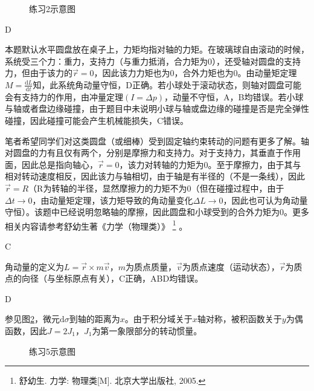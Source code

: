 \documentclass[b5paper,opensource,sourcefont,parskip]{qyxf-book}
\newcommand{\di}[1]{\mathrm{d}#1}
\newcommand{\dy}[2]{\frac{\di{#1}}{\di{#2}}}
\newcommand{\zbj}[4]
{
	\draw (0,0) node[below left] {$ O $};
	\draw [->] (#1,0) -- (#2,0) node[right] {$ x $};
	\draw [->] (0,#3) -- (0,#4) node[right] {$ y $};
}
\begin{document}
\begin{figure}[htbp]
\centering
{}
\caption{练习2示意图}\label{fig:c4-t2}
\end{figure}
			
D

\solve 本题默认水平圆盘放在桌子上，力矩均指对轴的力矩。在玻璃球自由滚动的时候，系统受三个力：重力，支持力（与重力抵消，合力矩为0），还受轴对圆盘的支持力，但由于该力的$ \vec{r}=0 $，因此该力力矩也为0，合外力矩也为0。由动量矩定理$ M=\dy{L}{t} $知，此系统角动量守恒，D正确。若小球处于滚动状态，则轴对圆盘可能会有支持力的作用，由冲量定理$ (I=\Delta p) $，动量不守恒，A，B均错误。若小球与轴或者盘边缘碰撞，由于题目中未说明小球与轴或盘边缘的碰撞是否是完全弹性碰撞，因此碰撞可能会产生机械能损失，C错误。

\begin{note}
笔者希望同学们对这类圆盘（或细棒）受到固定轴约束转动的问题有更多了解。轴对圆盘的力有且仅有两个，分别是摩擦力和支持力。对于支持力，其垂直于作用面，因此总是指向轴心，$ \vec{r}=0 $，该力对转轴的力矩为0。至于摩擦力，由于其与相对转动速度相反，因此该力与轴相切，由于轴是有半径的（不是一条线），因此$ \vec{r}=R $（R为转轴的半径，显然摩擦力的力矩不为0（但在碰撞过程中，由于$ \Delta t\to 0 $，由动量矩定理，该力矩导致的角动量变化$ \Delta L\to 0 $，因此也可认为角动量守恒）。该题中已经说明忽略轴的摩擦，因此圆盘和小球受到的合外力矩为0。更多相关内容请参考舒幼生著《力学（物理类）》
\footnote{舒幼生. 力学: 物理类[M]. 北京大学出版社, 2005.}
。
\end{note}
			
C
			
\solve 角动量的定义为$ L=\vec{r}\times m\vec{v} $，$ m $为质点质量，$ \vec{v} $为质点速度（运动状态），$ \vec{r} $为质点的向径（与坐标原点有关），C正确，ABD均错误。
			
D

\solve 参见图\ref{fig:c4-t5}，微元$ \di{\sigma} $到轴的距离为$ x $。由于积分域关于$ x $轴对称，被积函数关于$ y $为偶函数，因此$ J=2J_1 $，$ J_1 $为第一象限部分的转动惯量。

\begin{figure}[htbp]
\centering		
{}
\caption{练习5示意图}\label{fig:c4-t5}
\end{figure}
\end{document}

